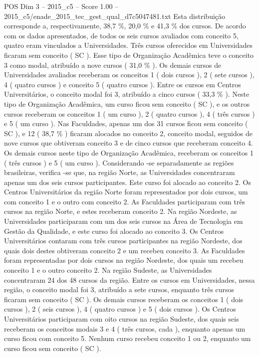 \begin{textsample}{POS Dim 3 – 2015\_c5 – Score 1.00 – 2015\_c5/enade\_2015\_tec\_gest\_qual\_d7c5047481.txt}
Esta distribuição corresponde a, respectivamente, 38,7 \%, 20,0 \% e 41,3 \% dos cursos.
De acordo com os dados apresentados, de todos os seis cursos avaliados com conceito 5, quatro eram vinculados a Universidades.
Três cursos oferecidos em Universidades ficaram sem conceito ( SC ).
Esse tipo de Organização Acadêmica teve o conceito 3 como modal, atribuído a nove cursos ( 31,0 \% ).
Os demais cursos de Universidades avaliados receberam os conceitos 1 ( dois cursos ), 2 ( sete cursos ), 4 ( quatro cursos ) e conceito 5 ( quatro cursos ).
Entre os cursos em Centros Universitários, o conceito modal foi 3, atribuído a cinco cursos ( 33,3 \% ).
Neste tipo de Organização Acadêmica, um curso ficou sem conceito ( SC ), e os outros cursos receberam os conceitos 1 ( um curso ), 2 ( quatro cursos ), 4 ( três cursos ) e 5 ( um curso ).
Nas Faculdades, apenas um dos 31 cursos ficou sem conceito ( SC ), e 12 ( 38,7 \% ) ficaram alocados no conceito 2, conceito modal, seguidos de nove cursos que obtiveram conceito 3 e de cinco cursos que receberam conceito 4.
Os demais cursos neste tipo de Organização Acadêmica, receberam os conceitos 1 ( três cursos ) e 5 ( um curso ).
Considerando -se separadamente as regiões brasileiras, verifica -se que, na região Norte, as Universidades concentraram apenas um dos seis cursos participantes.
Este curso foi alocado ao conceito 2.
Os Centros Universitários da região Norte foram representados por dois cursos, um com conceito 1 e o outro com conceito 2.
As Faculdades participaram com três cursos na região Norte, e estes receberam conceito 2.
Na região Nordeste, as Universidades participaram com um dos seis cursos na Área de Tecnologia em Gestão da Qualidade, e este curso foi alocado ao conceito 3.
Os Centros Universitários contaram com três cursos participantes na região Nordeste, dos quais dois destes obtiveram conceito 2 e um recebeu conceito 3.
As Faculdades foram representadas por dois cursos na região Nordeste, dos quais um recebeu conceito 1 e o outro conceito 2.
Na região Sudeste, as Universidades concentraram 24 dos 48 cursos da região.
Entre os cursos em Universidades, nessa região, o conceito modal foi 3, atribuído a sete cursos, enquanto três cursos ficaram sem conceito ( SC ).
Os demais cursos receberam os conceitos 1 ( dois cursos ), 2 ( seis cursos ), 4 ( quatro cursos ) e 5 ( dois cursos ).
Os Centros Universitários participaram com oito cursos na região Sudeste, dos quais seis receberam os conceitos modais 3 e 4 ( três cursos, cada ), enquanto apenas um curso ficou com conceito 5.
Nenhum curso recebeu conceito 1 ou 2, enquanto um curso ficou sem conceito ( SC ).

\end{textsample}
